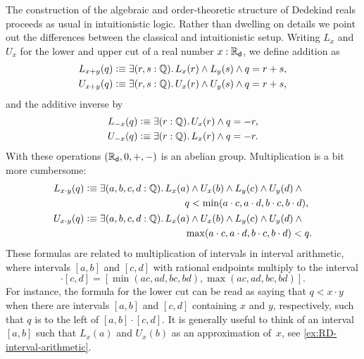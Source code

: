 The construction of the algebraic and order-theoretic structure of Dedekind reals proceeds
as usual in intuitionistic logic. Rather than dwelling on details we point out the
differences between the classical and intuitionistic setup. Writing $L_x$ and $U_x$ for
the lower and upper cut of a real number $x : \mathbb{R}_\mathsf{d}$, we define addition as%
%
%
\begin{align*}
  L_{x + y}(q) &\defeq \exis{r, s : \Q} L_x(r) \land L_y(s) \land q = r + s, \\
  U_{x + y}(q) &\defeq \exis{r, s : \Q} U_x(r) \land U_y(s) \land q = r + s,
\end{align*}
%
and the additive inverse by
%
\begin{align*}
  L_{-x}(q) &\defeq \exis{r : \Q} U_x(r) \land q = - r, \\
  U_{-x}(q) &\defeq \exis{r : \Q} L_x(r) \land q = - r.
\end{align*}
%
With these operations $(\mathbb{R}_\mathsf{d}, 0, {+}, {-})$ is an abelian group. Multiplication is a bit
more cumbersome:
%
%
\begin{align*}
  L_{x \cdot y}(q) &\defeq
  \begin{aligned}[t]
    \exis{a, b, c, d : \Q} & L_x(a) \land U_x(b) \land L_y(c) \land U_y(d) \land {}\\
                           & \qquad q < \min (a \cdot c, a \cdot d, b \cdot c, b \cdot d),
  \end{aligned} \\
  U_{x \cdot y}(q) &\defeq
  \begin{aligned}[t]
    \exis{a, b, c, d : \Q} & L_x(a) \land U_x(b) \land L_y(c) \land U_y(d) \land {}\\
                           & \qquad \max (a \cdot c, a \cdot d, b \cdot c, b \cdot d) < q.
  \end{aligned}
\end{align*}
%
%
These formulas are related to multiplication of intervals in interval arithmetic, where
intervals $[a,b]$ and $[c,d]$ with rational endpoints multiply to the interval
%
\begin{equation*}
  [a,b] \cdot [c,d] =
  [\min(a c, a d, b c, b d), \max(a c, a d, b c, b d)].
\end{equation*}
%
For instance, the formula for the lower cut can be read as saying that $q < x \cdot y$
when there are intervals $[a,b]$ and $[c,d]$ containing $x$ and $y$, respectively, such
that $q$ is to the left of $[a,b] \cdot [c,d]$. It is generally useful to think of an
interval $[a,b]$ such that $L_x(a)$ and $U_x(b)$ as an approximation of~$x$, see
\autoref{ex:RD-interval-arithmetic}.

